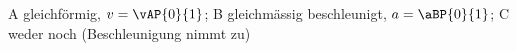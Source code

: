 A gleichförmig, $v = \vAP{0}{1}$; B gleichmässig beschleunigt, $a = \aBP{0}{1}$; C weder noch (Beschleunigung nimmt zu)
